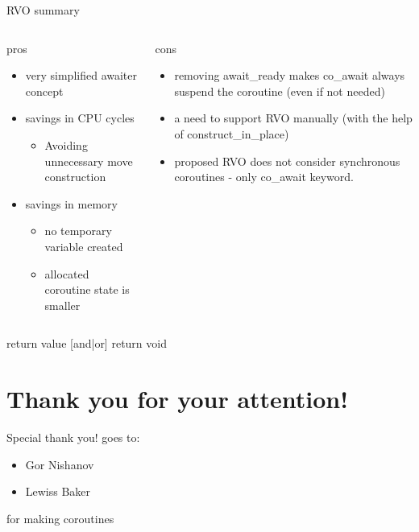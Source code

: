 \documentclass[10pt]{beamer}
\begin{document}
\begin{frame}{RVO summary}
\begin{columns}[T]

\begin{column}{0.48\linewidth}
\centerline{pros}
\begin{itemize}[<+-| alert@+>]
	\item very simplified awaiter concept
	\item savings in CPU cycles
	\begin{itemize}
		\item Avoiding unnecessary move construction
	\end{itemize}
	\item savings in memory
	\begin{itemize}
		\item no temporary variable created
		\item allocated coroutine state is smaller
	\end{itemize}
\end{itemize}
\end{column}
\begin{column}{0.48\linewidth}
\centerline{cons}
\begin{itemize}[<+-| alert@+>]
	\item removing \alert{await\_ready} makes \alert{co\_await} always suspend the coroutine (even if not needed)
	\item a need to support RVO manually (with the help of \alert{construct\_in\_place})
	\item proposed RVO does not consider synchronous coroutines - only \alert{co\_await} keyword.
\end{itemize}
\end{column}
\end{columns}

\end{frame}

\begin{frame}{return value [and|or] return void}

\end{frame}

\section*{Thank you for your attention!}

\begin{frame}{Special thank you! goes to:}
	\begin{itemize}
		\item Gor Nishanov
		\item Lewiss Baker	
	\end{itemize}

	for making coroutines 
\end{frame}
\end{document}
